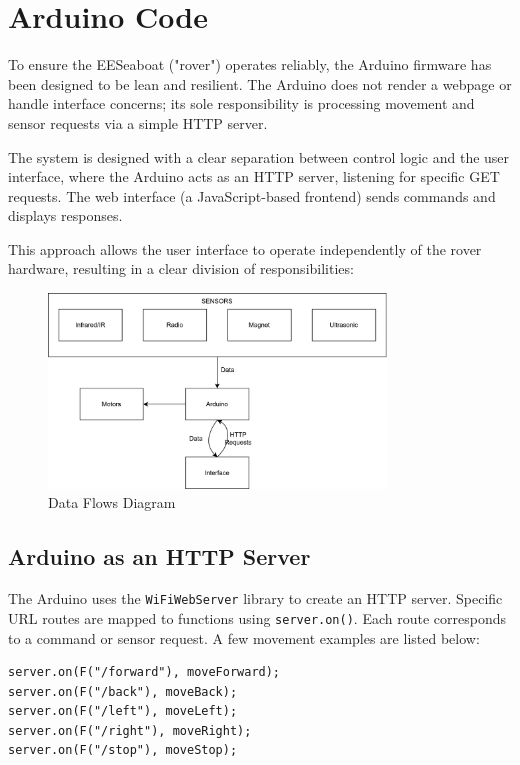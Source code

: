 \section{Arduino Code}
To ensure the EESeaboat ("rover") operates reliably, the Arduino firmware has been designed to be lean and resilient. The Arduino does not render a webpage or handle interface concerns; its sole responsibility is processing movement and sensor requests via a simple HTTP server.

The system is designed with a clear separation between control logic and the user interface, where the Arduino acts as an HTTP server, listening for specific GET requests. The web interface (a JavaScript-based frontend) sends commands and displays responses.

This approach allows the user interface to operate independently of the rover hardware, resulting in a clear division of responsibilities:

\begin{figure}[h]
  \centering
  \includegraphics[width=0.8\textwidth]{subpages/images/arduino_data_flows.png}
  \caption{Data Flows Diagram}
  \label{fig:data_flows}
\end{figure}

\subsection*{Arduino as an HTTP Server}
The Arduino uses the \texttt{WiFiWebServer} library to create an HTTP server. Specific URL routes are mapped to functions using \texttt{server.on()}. Each route corresponds to a command or sensor request. A few movement examples are listed below:

\begin{verbatim}
server.on(F("/forward"), moveForward);
server.on(F("/back"), moveBack);
server.on(F("/left"), moveLeft);
server.on(F("/right"), moveRight);
server.on(F("/stop"), moveStop);
\end{verbatim}

